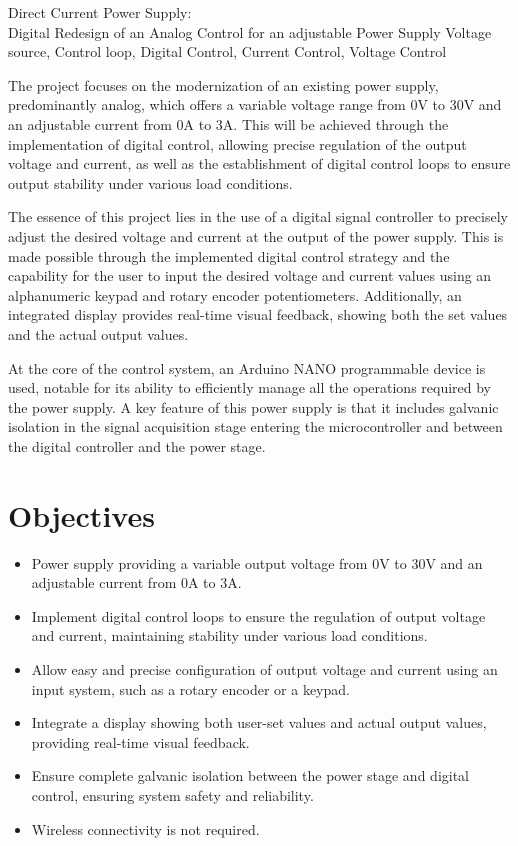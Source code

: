 
\begin{theabstract} {Direct Current Power Supply:\\Digital Redesign of an Analog Control for an adjustable Power Supply} {Voltage source, Control loop, Digital Control, Current Control, Voltage Control}

The project focuses on the modernization of an existing power supply, predominantly analog, which offers a variable voltage range from 0V to 30V and an adjustable current from 0A to 3A. This will be achieved through the implementation of digital control, allowing precise regulation of the output voltage and current, as well as the establishment of digital control loops to ensure output stability under various load conditions.\par

The essence of this project lies in the use of a digital signal controller to precisely adjust the desired voltage and current at the output of the power supply. This is made possible through the implemented digital control strategy and the capability for the user to input the desired voltage and current values using an alphanumeric keypad and rotary encoder potentiometers. Additionally, an integrated display provides real-time visual feedback, showing both the set values and the actual output values. \par

At the core of the control system, an Arduino NANO programmable device is used, notable for its ability to efficiently manage all the operations required by the power supply. A key feature of this power supply is that it includes galvanic isolation in the signal acquisition stage entering the microcontroller and between the digital controller and the power stage. \par

\section*{Objectives}

\begin{itemize}
    \item Power supply providing a variable output voltage from 0V to 30V and an adjustable current from 0A to 3A.
    \item Implement digital control loops to ensure the regulation of output voltage and current, maintaining stability under various load conditions.
    \item Allow easy and precise configuration of output voltage and current using an input system, such as a rotary encoder or a keypad.
    \item Integrate a display showing both user-set values and actual output values, providing real-time visual feedback.
    \item Ensure complete galvanic isolation between the power stage and digital control, ensuring system safety and reliability.
    \item Wireless connectivity is not required.
\end{itemize}

\end{theabstract}

